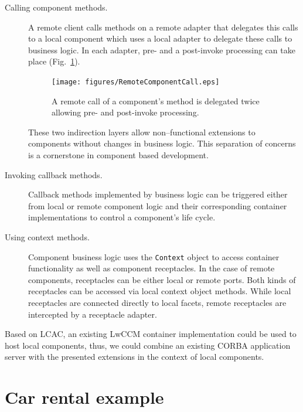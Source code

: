 \begin{description}
\item [Calling component methods.]
A remote client calls methods on a remote adapter that delegates this
calls to a local component which uses a local adapter to delegate these calls
to business logic.
In each adapter, pre- and a post-invoke processing can take place 
(Fig.~\ref{RemoteComponentCall}).
\begin{figure}[htbp]
    \begin{center}
    \texttt{[image: figures/RemoteComponentCall.eps]}
    \caption{A remote call of a component's method is delegated twice
    allowing pre- and post-invoke processing.}
    \label{RemoteComponentCall}            
    \end{center}
\end{figure}

These two indirection layers allow non--functional extensions to 
components without changes in business logic. 
This separation of concerns is a cornerstone in component
based development.

\item [Invoking callback methods.]
Callback methods implemented by business logic can be
triggered either from local or remote component logic and their corresponding
container implementations to control a component's life cycle.

\item [Using context methods.]
Component business logic uses the {\tt Context} object to access container
functionality as well as component receptacles.
In the case of remote components, receptacles can be either local or remote
ports. Both kinds of receptacles can be accessed via local context
object methods. While local receptacles are connected directly to local facets,
remote receptacles are intercepted by a receptacle adapter.
\end{description}

\noindent
Based on LCAC, an existing LwCCM container implementation could be used to host 
local components, thus, we could combine an existing CORBA application server 
with the presented extensions in the context of local components. 



\newpage
\section{Car rental example}

